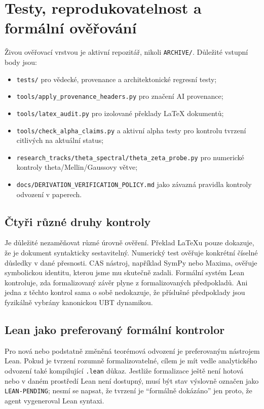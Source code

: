 
\chapter{Testy, reprodukovatelnost a formální ověřování}
\label{ch:tests-repro}

Živou ověřovací vrstvou je aktivní repozitář, nikoli \texttt{ARCHIVE/}.
Důležité vstupní body jsou:
\begin{itemize}
 \item \texttt{tests/} pro vědecké, provenance a architektonické regresní testy;
 \item \texttt{tools/apply\_provenance\_headers.py} pro značení AI provenance;
 \item \texttt{tools/latex\_audit.py} pro izolované překlady LaTeX dokumentů;
 \item \texttt{tools/check\_alpha\_claims.py} a aktivní alpha testy pro
       kontrolu tvrzení citlivých na aktuální status;
 \item \texttt{research\_tracks/theta\_spectral/theta\_zeta\_probe.py} pro
       numerické kontroly theta/Mellin/Gaussovy větve;
 \item \texttt{docs/DERIVATION\_VERIFICATION\_POLICY.md} jako závazná pravidla
       kontroly odvození v paperech.
\end{itemize}

\section{Čtyři různé druhy kontroly}
Je důležité nezaměňovat různé úrovně ověření. Překlad LaTeXu pouze dokazuje,
že je dokument syntakticky sestavitelný. Numerický test ověřuje konkrétní
číselné důsledky v dané přesnosti. CAS nástroj, například SymPy nebo Maxima,
ověřuje symbolickou identitu, kterou jsme mu skutečně zadali. Formální systém
Lean kontroluje, zda formalizovaný závěr plyne z formalizovaných předpokladů.
Ani jedna z těchto kontrol sama o sobě nedokazuje, že příslušné předpoklady jsou
fyzikálně vybrány kanonickou UBT dynamikou.

\section{Lean jako preferovaný formální kontrolor}
Pro nová nebo podstatně změněná teorémová odvození je preferovaným nástrojem
Lean. Pokud je tvrzení rozumně formalizovatelné, cílem je mít vedle analytického
odvození také kompilující \texttt{.lean} důkaz. Jestliže formalizace ještě není
hotová nebo v daném prostředí Lean není dostupný, musí být stav výslovně
označen jako \texttt{LEAN-PENDING}; nesmí se napsat, že tvrzení je ``formálně
dokázáno'' jen proto, že agent vygeneroval Lean syntaxi.

